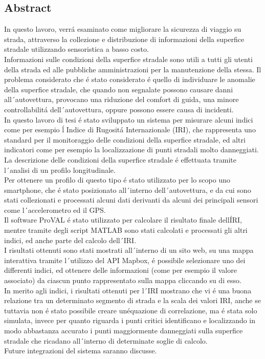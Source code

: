 \documentclass{standalone}
\begin{document}
\begin{flushright}
\section*{Abstract}\label{Abstract_IT}
\vspace{10mm}
\end{flushright}
\noindent In questo lavoro, verr\'a esaminato come migliorare la sicurezza di viaggio su strada, attraverso la collezione e distribuzione di informazioni della superfice stradale utilizzando sensoristica a basso costo. \\ Informazioni sulle condizioni della superfice stradale sono utili a tutti gli utenti della strada ed alle pubbliche amministrazioni per la manutenzione della stessa. 
Il problema considerato che \'e stato considerato \'e quello di individuare le anomalie della superfice stradale, che quando non segnalate possono causare danni all\'\ autovettura, provocano una riduzione del comfort di guida, una minore controllabilit\'a dell\'\ autovettura, oppure possono essere causa di incidenti.\\ In questo lavoro di tesi \'e stato sviluppato un sistema per misurare alcuni indici come per esempio \'l Indice di Rugosit\'a Internazionale (IRI), che rappresenta uno standard per il monitoraggio delle condizioni della superfice stradale, ed altri indicatori come per esempio la localizzazione di punti stradali molto danneggiati.\\La descrizione delle condizioni della superfice stradale \'e effettuata tramite l\'\ analisi di un profilo longitudinale. \\ Per ottenere un profilo di questo tipo \'e stato utilizzato per lo scopo uno smartphone, che \'e stato posizionato all\'\ interno dell\'\ autovettura, e da cui sono stati collezionati e processati alcuni dati derivanti da alcuni dei principali sensori come l\'\ accelerometro ed il GPS. \\ Il software ProVAL \'e stato utilizzato per calcolare il risultato finale dell\'IRI, mentre tramite degli script MATLAB sono stati calcolati e processati gli altri indici, ed anche parte del calcolo dell\'\ IRI. \\ I risultati ottenuti sono stati mostrati all\'\ interno di un sito web, su una mappa interattiva tramite l\'\ utilizzo del API Mapbox, \'e possibile selezionare uno dei differenti indici, ed ottenere delle informazioni (come per esempio il valore associato) da ciascun punto rappresentato sulla mappa cliccando su di esso. \\ In merito agli indici, i risultati ottenuti per l\'\ IRI mostrano che vi \'e una buona relazione tra un determinato segmento di strada e la scala dei valori IRI, anche se tuttavia non \'e stato possibile creare un\'equazione di correlazione, ma \'e stata solo simulata, invece per quanto riguarda i punti critici identificano e localizzando in modo abbastanza accurato i punti maggiormente danneggiati sulla superfice stradale che ricadano all\'\ interno di determinate soglie di calcolo.\\
Future integrazioni del sistema saranno discusse.
\clearpage
\end{document}
